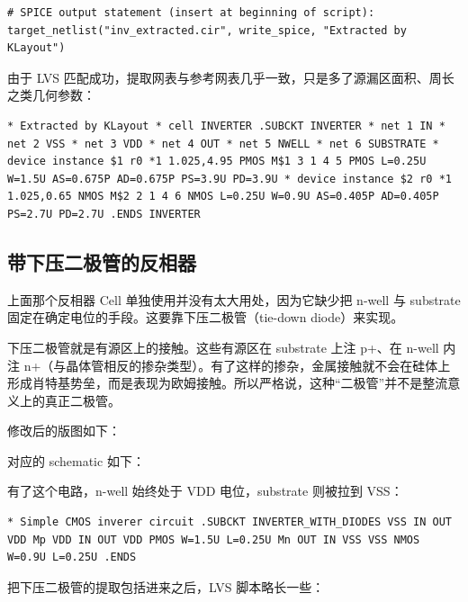 \begin{lstlisting}
# SPICE output statement (insert at beginning of script): target_netlist("inv_extracted.cir", write_spice, "Extracted by KLayout")
\end{lstlisting}

由于 LVS 匹配成功，提取网表与参考网表几乎一致，只是多了源漏区面积、周长之类几何参数：

\begin{lstlisting}
* Extracted by KLayout * cell INVERTER .SUBCKT INVERTER * net 1 IN * net 2 VSS * net 3 VDD * net 4 OUT * net 5 NWELL * net 6 SUBSTRATE * device instance $1 r0 *1 1.025,4.95 PMOS M$1 3 1 4 5 PMOS L=0.25U W=1.5U AS=0.675P AD=0.675P PS=3.9U PD=3.9U * device instance $2 r0 *1 1.025,0.65 NMOS M$2 2 1 4 6 NMOS L=0.25U W=0.9U AS=0.405P AD=0.405P PS=2.7U PD=2.7U .ENDS INVERTER
\end{lstlisting}

\subsection{带下压二极管的反相器}

上面那个反相器 Cell 单独使用并没有太大用处，因为它缺少把 n-well 与 substrate 固定在确定电位的手段。这要靠下压二极管（tie-down diode）来实现。

下压二极管就是有源区上的接触。这些有源区在 substrate 上注 p+、在 n-well 内注 n+（与晶体管相反的掺杂类型）。有了这样的掺杂，金属接触就不会在硅体上形成肖特基势垒，而是表现为欧姆接触。所以严格说，这种“二极管”并不是整流意义上的真正二极管。

修改后的版图如下：


对应的 schematic 如下：


有了这个电路，n-well 始终处于 VDD 电位，substrate 则被拉到 VSS：

\begin{lstlisting}
* Simple CMOS inverer circuit .SUBCKT INVERTER_WITH_DIODES VSS IN OUT VDD Mp VDD IN OUT VDD PMOS W=1.5U L=0.25U Mn OUT IN VSS VSS NMOS W=0.9U L=0.25U .ENDS
\end{lstlisting}

把下压二极管的提取包括进来之后，LVS 脚本略长一些：

